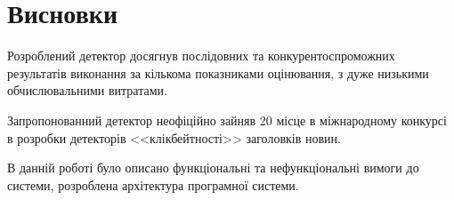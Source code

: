 \section*{Висновки}
Розроблений детектор досягнув послідовних та конкурентоспроможних результатів виконання за кількома показниками оцінювання, з дуже низькими обчислювальними витратами. 

Запропонованний детектор неофіційно зайняв 20 місце в міжнародному конкурсі в розробки детекторів <<клікбейтності>> заголовків новин.

В данній роботі було описано функціональні та нефункціональні вимоги до системи, розроблена архітектура програмної системи.




